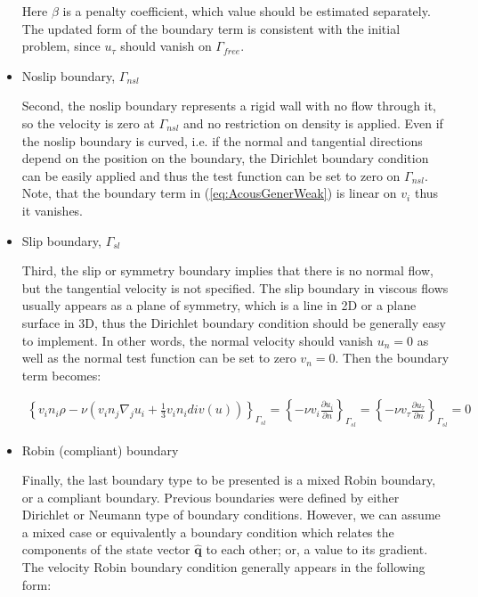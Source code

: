 \begin{itemize}
  Here $\beta$ is a penalty coefficient, which value should be estimated separately. The updated form of the boundary term is consistent with the initial problem, since $u_{\tau}$ should vanish on ${\Gamma_{free}}$.
  
  \item Noslip boundary, $\Gamma_{nsl}$
  
  Second, the noslip boundary represents a rigid wall with no flow through it, so the velocity is zero at $\Gamma_{nsl}$ and no restriction on density is applied. Even if the noslip boundary is curved, i.e. if the normal and tangential directions depend on the position on the boundary, the Dirichlet boundary condition can be easily applied and thus the test function can be set to zero on $\Gamma_{nsl}$. Note, that the boundary term in (\ref{eq:AcousGenerWeak}) is linear on $v_i$ thus it vanishes.
  
  \item Slip boundary, $\Gamma_{sl}$
  
  Third, the slip or symmetry boundary implies that there is no normal flow, but the tangential velocity is not specified. The slip boundary in viscous flows usually appears as a plane of symmetry, which is a line in 2D or a plane surface in 3D, thus the Dirichlet boundary condition should be generally easy to implement. In other words, the normal velocity should vanish $u_n = 0$ as well as the normal test function can be set to zero $v_n = 0$. Then the boundary term becomes:
  
  \begin{equation}
  \begin{aligned}
  \left\{ v_i n_i \rho  - \nu \left( v_i n_j \nabla_j u_i + \frac{1}{3} v_i n_i div(u) \right) \right\}_{\Gamma_{sl}} =   \left\{ - \nu  v_i \frac{\partial u_i}{\partial n} \right\}_{\Gamma_{sl}} = 
  \left\{ - \nu  v_{\tau} \frac{\partial u_{\tau}}{\partial n}  \right\}_{\Gamma_{sl}} = 0
  \end{aligned}
  \end{equation}
  
  \item Robin (compliant) boundary
  
  Finally, the last boundary type to be presented is a mixed Robin boundary, or a compliant boundary. Previous boundaries were defined by either Dirichlet or Neumann type of boundary conditions. However, we can assume a mixed case or equivalently a boundary condition which relates the components of the state vector $\hat{\mathbf{q}}$ to each other; or, a value to its gradient. The velocity Robin boundary condition generally appears in the following form:
  

\end{itemize}
